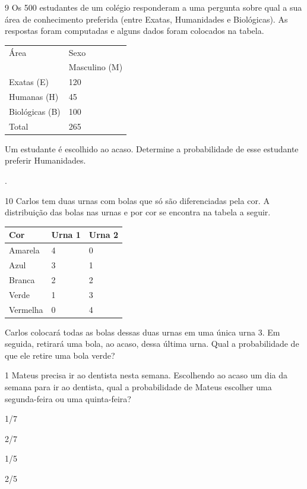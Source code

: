 \num{9} Os 500 estudantes de um colégio responderam a uma pergunta sobre
qual a sua área de conhecimento preferida (entre Exatas, Humanidades e
Biológicas). As respostas foram computadas e alguns dados foram colocados
na tabela.

\begin{longtable}[]{@{}ll@{}}
\toprule
Área & Sexo\tabularnewline
& Masculino (M)\tabularnewline
Exatas (E) & 120\tabularnewline
Humanas (H) & 45\tabularnewline
Biológicas (B) & 100\tabularnewline
Total & 265\tabularnewline
\bottomrule
\end{longtable}

Um estudante é escolhido ao acaso. Determine a probabilidade de esse
estudante preferir Humanidades.

.


\num{10} Carlos tem duas urnas com bolas que só são diferenciadas pela
cor. A distribuição das bolas nas urnas e por cor se encontra na tabela
a seguir.

\begin{longtable}[]{@{}lll@{}}
\toprule
Cor & Urna 1 & Urna 2\tabularnewline
\midrule
\endhead
Amarela & 4 & 0\tabularnewline
Azul & 3 & 1\tabularnewline
Branca & 2 & 2\tabularnewline
Verde & 1 & 3\tabularnewline
Vermelha & 0 & 4\tabularnewline
\bottomrule
\end{longtable}

Carlos colocará todas as bolas dessas duas urnas em uma única urna 3. Em
seguida, retirará uma bola, ao acaso, dessa última urna. Qual a
probabilidade de que ele retire uma bola verde?




\num{1} Mateus precisa ir ao dentista nesta semana. Escolhendo ao acaso um
dia da semana para ir ao dentista, qual a probabilidade de Mateus
escolher uma segunda-feira ou uma quinta-feira?

\begin{escolha}
\item
  1/7
\item
  2/7
\item
  1/5
\item
  2/5
\end{escolha}

